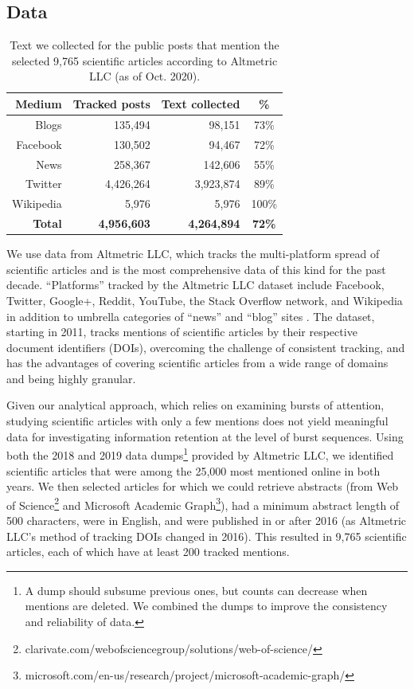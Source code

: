\documentclass[letterpaper]{article} %
\begin{document}
\subsection{Data}
\begin{table}[t]
    \centering
    \begin{tabular}{r|r|r|c}
         \textbf{Medium} & \textbf{Tracked posts} & \textbf{Text collected} & \textbf{\%} \\
         \hline
         Blogs & 135,494 & 98,151 & 73\% \\
         Facebook & 130,502 & 94,467 & 72\% \\
         News & 258,367 & 142,606 &  55\% \\
         Twitter & 4,426,264 & 3,923,874 & 89\% \\
         Wikipedia & 5,976 & 5,976 & 100\% \\
         \hline
         \textbf{Total} & \textbf{4,956,603} & \textbf{4,264,894} & \textbf{72\%}\\
    \end{tabular}
    \caption{Text we collected for the public posts that mention the selected 9,765 scientific articles according to Altmetric LLC (as of Oct. 2020).}
    \label{tab:collected_data_nums}
\end{table}

We use data from Altmetric LLC, which tracks the multi-platform spread of scientific articles and is the most comprehensive data of this kind for the past decade. ``Platforms'' tracked by the Altmetric LLC dataset include Facebook, Twitter, Google+, Reddit, YouTube, the Stack Overflow network, and Wikipedia in addition to umbrella categories of ``news'' and ``blog'' sites \cite{altmetricsupportOurDataOur2021}. The dataset, starting in 2011, tracks mentions of scientific articles by their respective document identifiers (DOIs), overcoming the challenge of consistent tracking, and has the advantages of covering scientific articles from a wide range of domains and being highly granular.

Given our analytical approach, which relies on examining bursts of attention, studying scientific articles with only a few mentions does not yield meaningful data for investigating information retention at the level of burst sequences. Using both the 2018 and 2019 data dumps\footnote{A dump should subsume previous ones, but counts can decrease when mentions are deleted. We combined the dumps to improve the consistency and reliability of data.} provided by Altmetric LLC, we identified scientific articles that were among the 25,000 most mentioned online in both years. We then selected articles for which we could retrieve abstracts (from Web of Science\footnote{clarivate.com/webofsciencegroup/solutions/web-of-science/} and Microsoft Academic Graph\footnote{microsoft.com/en-us/research/project/microsoft-academic-graph/}), had a minimum abstract length of 500 characters, were in English, and were published in or after 2016 (as Altmetric LLC's method of tracking DOIs changed in 2016). This resulted in 9,765 scientific articles, each of which have at least 200 tracked mentions.
\end{document}
